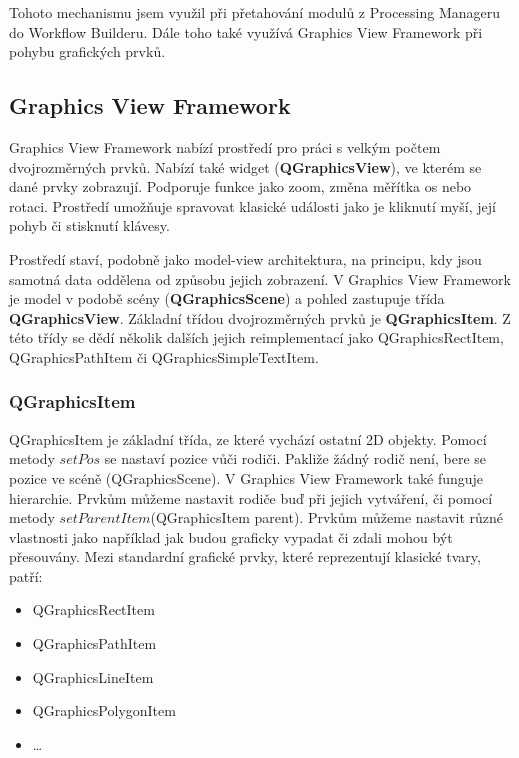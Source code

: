 Tohoto mechanismu jsem využil při přetahování modulů z Processing Manageru do Workflow Builderu. Dále toho také využívá Graphics View Framework při pohybu grafických prvků.

\subsection{Graphics View Framework}
Graphics View Framework nabízí prostředí pro práci s velkým počtem dvojrozměrných prvků. Nabízí také widget (\textbf{QGraphicsView}), ve kterém se dané prvky zobrazují. Podporuje funkce jako zoom, změna měřítka os nebo rotaci. Prostředí umožňuje spravovat klasické události jako je kliknutí myší, její pohyb či stisknutí klávesy. 

Prostředí staví, podobně jako model-view architektura, na principu, kdy jsou samotná data oddělena od způsobu jejich zobrazení. V Graphics View Framework je model v podobě scény (\textbf{QGraphicsScene}) a pohled zastupuje třída \textbf{QGraphicsView}. Základní třídou dvojrozměrných prvků je \textbf{QGraphicsItem}. Z této třídy se dědí několik dalších jejich reimplementací jako QGraphicsRectItem, QGraphicsPathItem či QGraphicsSimpleTextItem. 

\subsubsection*{QGraphicsItem}
QGraphicsItem je základní třída, ze které vychází ostatní 2D objekty. Pomocí metody $setPos$ se nastaví pozice vůči rodiči. Pakliže žádný rodič není, bere se pozice ve scéně (QGraphicsScene). V Graphics View Framework také funguje hierarchie. Prvkům můžeme nastavit rodiče buď při jejich vytváření, či pomocí metody $setParentItem$(QGraphicsItem parent). Prvkům můžeme nastavit různé vlastnosti jako například jak budou graficky vypadat či zdali mohou být přesouvány. Mezi standardní grafické prvky, které reprezentují klasické tvary, patří:\\
\begin{itemize}
	\item QGraphicsRectItem
	\item QGraphicsPathItem
	\item QGraphicsLineItem
	\item QGraphicsPolygonItem
	\item \ldots
\end{itemize}
 
